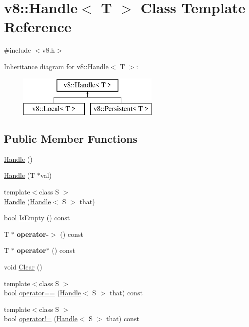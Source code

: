 \hypertarget{classv8_1_1_handle}{}\section{v8\+:\+:Handle$<$ T $>$ Class Template Reference}
\label{classv8_1_1_handle}


{\ttfamily \#include $<$v8.\+h$>$}

Inheritance diagram for v8\+:\+:Handle$<$ T $>$\+:\begin{figure}[H]
\begin{center}
\leavevmode
\includegraphics[height=2.000000cm]{classv8_1_1_handle}
\end{center}
\end{figure}
\subsection*{Public Member Functions}
\begin{DoxyCompactItemize}
\item 
\hyperlink{classv8_1_1_handle_aa7543a3d572565806a66e922634cc2f4}{Handle} ()
\item 
\hyperlink{classv8_1_1_handle_aac16277f1131898a4a2ef664d051cc18}{Handle} (T $\ast$val)
\item 
{\footnotesize template$<$class S $>$ }\\\hyperlink{classv8_1_1_handle_a64aee8fcde243c8a5abebfe534b3797a}{Handle} (\hyperlink{classv8_1_1_handle}{Handle}$<$ S $>$ that)
\item 
bool \hyperlink{classv8_1_1_handle_ab3b20b28e7f672de83a2dc8d6809f815}{Is\+Empty} () const 
\item 
\hypertarget{classv8_1_1_handle_a6709a0485a59f1c38c477aae7fb4e78e}{}T $\ast$ {\bfseries operator-\/$>$} () const \label{classv8_1_1_handle_a6709a0485a59f1c38c477aae7fb4e78e}

\item 
\hypertarget{classv8_1_1_handle_a51518c9fefc9f74942c1e8a6af97a8dd}{}T $\ast$ {\bfseries operator$\ast$} () const \label{classv8_1_1_handle_a51518c9fefc9f74942c1e8a6af97a8dd}

\item 
void \hyperlink{classv8_1_1_handle_a452516a09df056438c3d3a177ebd1977}{Clear} ()
\item 
{\footnotesize template$<$class S $>$ }\\bool \hyperlink{classv8_1_1_handle_afcc79738c6fff05c70e958a471f2b7d9}{operator==} (\hyperlink{classv8_1_1_handle}{Handle}$<$ S $>$ that) const 
\item 
{\footnotesize template$<$class S $>$ }\\bool \hyperlink{classv8_1_1_handle_ab550353b4a7bc3ad3df53fe80df7ea61}{operator!=} (\hyperlink{classv8_1_1_handle}{Handle}$<$ S $>$ that) const 
\end{DoxyCompactItemize}
